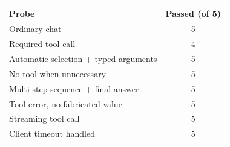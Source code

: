 \begin{tabular}{@{}lc@{}}
\toprule
Probe & Passed (of 5) \\
\midrule
Ordinary chat & 5 \\
Required tool call & 4 \\
Automatic selection + typed arguments & 5 \\
No tool when unnecessary & 5 \\
Multi-step sequence + final answer & 5 \\
Tool error, no fabricated value & 5 \\
Streaming tool call & 5 \\
Client timeout handled & 5 \\
\bottomrule
\end{tabular}
